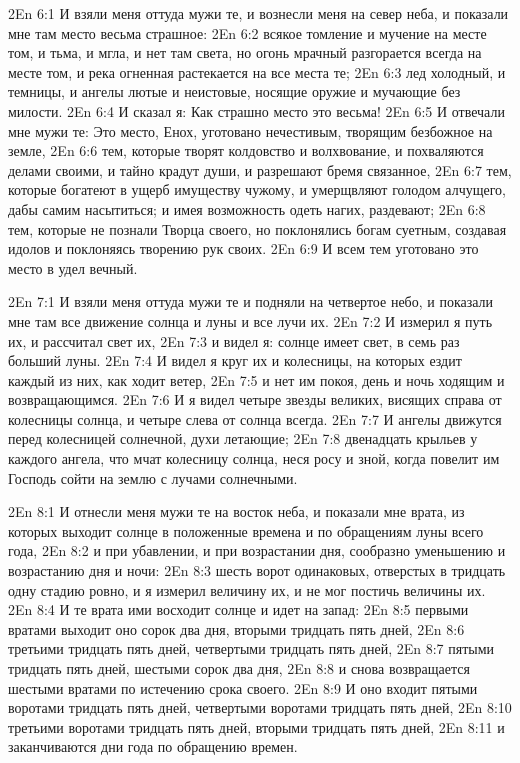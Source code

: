 \vs 2En 6:1
И взяли меня оттуда мужи те, и вознесли меня на север неба, и показали мне там место весьма страшное:
\vs 2En 6:2
всякое томление и мучение на месте том, и тьма, и мгла, и нет там света, но огонь мрачный разгорается всегда на месте том, и река огненная растекается на все места те;
\vs 2En 6:3
лед холодный, и темницы, и ангелы лютые и неистовые, носящие оружие и мучающие без милости.
\vs 2En 6:4
И сказал я: Как страшно место это весьма!
\vs 2En 6:5
И отвечали мне мужи те: Это место, Енох, уготовано нечестивым, творящим безбожное на земле,
\vs 2En 6:6
тем, которые творят колдовство и волхвование, и похваляются делами своими, и тайно крадут души, и разрешают бремя связанное,
\vs 2En 6:7
тем, которые богатеют в ущерб имуществу чужому, и умерщвляют голодом алчущего, дабы самим насытиться; и имея возможность одеть нагих, раздевают;
\vs 2En 6:8
тем, которые не познали Творца своего, но поклонялись богам суетным, создавая идолов и поклоняясь творению рук своих.
\vs 2En 6:9
И всем тем уготовано это место в удел вечный.

\vs 2En 7:1
И взяли меня оттуда мужи те и подняли на четвертое небо, и показали мне там все движение солнца и луны и все лучи их.
\vs 2En 7:2
И измерил я путь их, и рассчитал свет их,
\vs 2En 7:3
и видел я: солнце имеет свет, в семь раз больший луны.
\vs 2En 7:4
И видел я круг их и колесницы, на которых ездит каждый из них, как ходит ветер,
\vs 2En 7:5
и нет им покоя, день и ночь ходящим и возвращающимся.
\vs 2En 7:6
И я видел четыре звезды великих, висящих справа от колесницы солнца, и четыре слева от солнца всегда.
\vs 2En 7:7
И ангелы движутся перед колесницей солнечной, духи летающие;
\vs 2En 7:8
двенадцать крыльев у каждого ангела, что мчат колесницу солнца, неся росу и зной, когда повелит им Господь сойти на землю с лучами солнечными.

\vs 2En 8:1
И отнесли меня мужи те на восток неба, и показали мне врата, из которых выходит солнце в положенные времена и по обращениям луны всего года,
\vs 2En 8:2
и при убавлении, и при возрастании дня, сообразно уменьшению и возрастанию дня и ночи:
\vs 2En 8:3
шесть ворот одинаковых, отверстых в тридцать одну стадию ровно, и я измерил величину их, и не мог постичь величины их.
\vs 2En 8:4
И те врата ими восходит солнце и идет на запад:
\vs 2En 8:5
первыми вратами выходит оно сорок два дня, вторыми тридцать пять дней,
\vs 2En 8:6
третьими тридцать пять дней, четвертыми тридцать пять дней,
\vs 2En 8:7
пятыми тридцать пять дней, шестыми сорок два дня,
\vs 2En 8:8
и снова возвращается шестыми вратами по истечению срока своего.
\vs 2En 8:9
И оно входит пятыми воротами тридцать пять дней, четвертыми воротами тридцать пять дней,
\vs 2En 8:10
третьими воротами тридцать пять дней, вторыми тридцать пять дней,
\vs 2En 8:11
и заканчиваются дни года по обращению времен.

